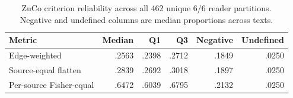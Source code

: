 \begin{table}[tbp]
\centering
\caption{ZuCo criterion reliability across all 462 unique 6/6 reader partitions. Negative and undefined columns are median proportions across texts.}
\label{tab:s3-criterion-uncertainty}
\small
\begin{tabular}{lrrrrr}
\toprule
Metric & Median & Q1 & Q3 & Negative & Undefined \\
\midrule
Edge-weighted & .2563 & .2398 & .2712 & .1849 & .0250 \\
Source-equal flatten & .2839 & .2692 & .3018 & .1897 & .0250 \\
Per-source Fisher-equal & .6472 & .6039 & .6795 & .2132 & .0250 \\
\bottomrule
\end{tabular}
\end{table}
